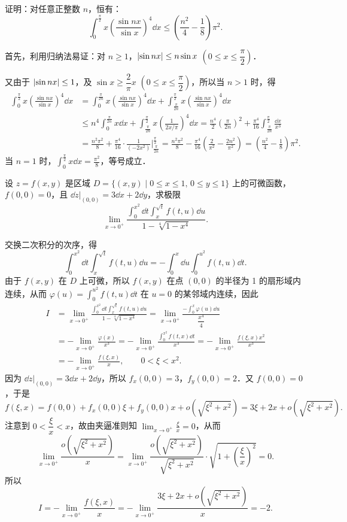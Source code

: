 证明：对任意正整数 $n$，恒有：
\[
  \int_0^{\frac{\pi}{2}}x\left(\frac{\sin nx}{\sin x}\right)^4\dd x\le\left(\frac{n^2}{4}-\frac18\right)\pi^2.
\]
\begin{solution}
首先，利用归纳法易证：对 $n\ge1$，$\left|\sin nx\right|\le n\sin x$ $\left(0\le x\le\dfrac{\pi}{2}\right)$．

又由于 $\left|\sin nx\right|\le1$，及 $\sin x\ge\dfrac2\pi x$ $\left(0\le x\le\dfrac{\pi}{2}\right)$，所以当 $n>1$ 时，得
\begin{align*}
\int_0^{\frac{\pi}{2}}x\left(\frac{\sin nx}{\sin x}\right)^4\dd x
&=\int_0^{\frac{\pi}{2n}}x\left(\frac{\sin nx}{\sin x}\right)^4\dd x
+\int_{\frac{\pi}{2n}}^{\frac{\pi}{2}}x\left(\frac{\sin nx}{\sin x}\right)^4\dd x\\
&\le n^4\int_0^{\frac{\pi}{2n}}x\dd x+\int_{\frac{\pi}{2n}}^{\frac{\pi}{2}}x\left(\frac{1}{2x/\pi}\right)^4\dd x
=\frac{n^4}{2}\left(\frac{\pi}{2n}\right)^2+\frac{\pi^4}{16}\int_{\frac{\pi}{2n}}^{\frac{\pi}{2}}\frac{\dd x}{x^3}\\
&=\frac{n^2\pi^2}{8}+\frac{\pi^4}{16}\cdot\frac{1}{(-2x^2)}\bigg|_{\frac{\pi}{2n}}^{\frac{\pi}{2}}
=\frac{n^2\pi^2}{8}-\frac{\pi^4}{16}\left(\frac{2}{\pi^2}-\frac{2n^2}{\pi^2}\right)
=\left(\frac{n^2}{4}-\frac18\right)\pi^2.
\end{align*}
当 $n=1$ 时，$\displaystyle \int_0^{\frac{\pi}{2}}x\dd x=\frac{\pi^2}{8}$，等号成立．
\end{solution}

设 $z=f(x,y)$ 是区域 $D=\{(x,y)\mid 0\le x\le1,\,0\le y\le1\}$ 上的可微函数，$f(0,0)=0$，且 $\dd z\big|_{(0,0)}=3\dd x+2\dd y$，求极限
\[
  \lim_{x\to0^+}\frac{\displaystyle\int_0^{x^2}\dd t\int_x^{\sqrt t}f(t,u)\dd u}{1-\sqrt[4]{1-x^4}}.
\]
\begin{solution}
交换二次积分的次序，得
\[
\int_0^{x^2}\dd t\int_x^{\sqrt t}f(t,u)\dd u=-\int_0^x\dd u\int_0^{u^2}f(t,u)\dd t.
\]
由于 $f(x,y)$ 在 $D$ 上可微，所以 $f(x,y)$ 在点 $(0,0)$ 的半径为 1 的扇形域内连续，从而 \mbox{$\varphi(u)=\int_0^{u^2}f(t,u)\dd t$} 在 $u=0$ 的某邻域内连续，因此
\begin{align*}
I&=\lim_{x\to0^+}\frac{\displaystyle\int_0^{x^2}\dd t\int_x^{\sqrt t}f(t,u)\dd u}{1-\sqrt[4]{1-x^4}}
=\lim_{x\to0^+}\frac{-\displaystyle\int_0^x\varphi(u)\dd u}{\dfrac{x^4}{4}}\\
&=-\lim_{x\to0^+}\frac{\varphi(x)}{x^3}
=-\lim_{x\to0^+}\frac{\displaystyle\int_0^{x^2}f(t,x)\dd t}{x^3}
=-\lim_{x\to0^+}\frac{f(\xi,x)x^2}{x^3}\\
&=-\lim_{x\to0^+}\frac{f(\xi,x)}{x},\qquad 0<\xi<x^2.
\end{align*}
因为 $\dd z\big|_{(0,0)}=3\dd x+2\dd y$，所以 $f_x(0,0)=3$，$f_y(0,0)=2$．又 $f(0,0)=0$，于是
\[
f(\xi,x)=f(0,0)+f_x(0,0)\xi+f_y(0,0)x+o\left(\sqrt{\xi^2+x^2}\right)
=3\xi+2x+o\left(\sqrt{\xi^2+x^2}\right).
\]
注意到 $0<\dfrac{\xi}{x}<x$，故由夹逼准则知 $\displaystyle \lim_{x\to0^+}\frac{\xi}{x}=0$，从而
\[
\lim_{x\to0^+}\frac{o\left(\sqrt{\xi^2+x^2}\right)}{x}
=\lim_{x\to0^+}\frac{o\left(\sqrt{\xi^2+x^2}\right)}{\sqrt{\xi^2+x^2}}\cdot\sqrt{1+\left(\frac{\xi}{x}\right)^2}=0.
\]
所以
\[
I=-\lim_{x\to0^+}\frac{f(\xi,x)}{x}
=-\lim_{x\to0^+}\frac{3\xi+2x+o\left(\sqrt{\xi^2+x^2}\right)}{x}=-2.
\]
\end{solution}

